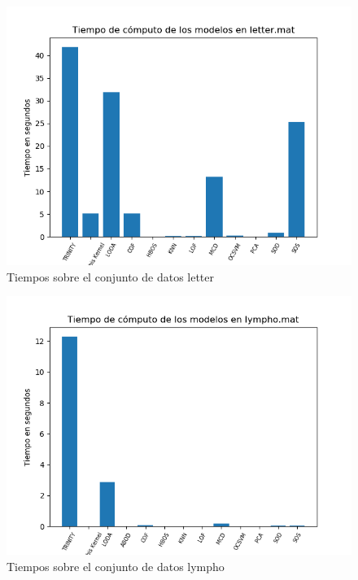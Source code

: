 \begin{figure}[H]
	\centering
	\includegraphics[scale=0.7]{imagenes/imgs-exp1/times/letter}
	\caption{Tiempos sobre el conjunto de datos letter}
	\label{letter_times}
\end{figure}

\begin{figure}[H]
	\centering
	\includegraphics[scale=0.7]{imagenes/imgs-exp1/times/lympho}
	\caption{Tiempos sobre el conjunto de datos lympho}
	\label{lympho_times}
\end{figure}

